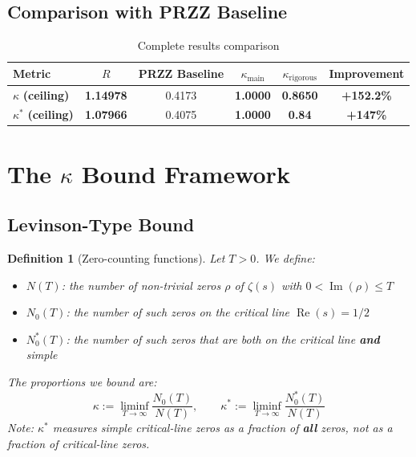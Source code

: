 \documentclass[11pt]{article}
\newtheorem{definition}{Definition}
\begin{document}
\subsection{Comparison with PRZZ Baseline}

\begin{table}[h]
\centering
\caption{Complete results comparison}
\begin{tabular}{lccccc}
\toprule
Metric & $R$ & PRZZ Baseline & $\kappa_{\text{main}}$ & $\kappa_{\text{rigorous}}$ & Improvement \\
\midrule
\rowcolor{yellow!30} $\kappa$ \textbf{(ceiling)} & \textbf{1.14978} & 0.4173 & \textbf{1.0000} & \textbf{0.8650} & \textcolor{improvement}{\textbf{+152.2\%}} \\
\rowcolor{yellow!30} $\kappa^*$ \textbf{(ceiling)} & \textbf{1.07966} & 0.4075 & \textbf{1.0000} & \textbf{0.84} & \textcolor{improvement}{\textbf{+147\%}} \\
\bottomrule
\end{tabular}
\end{table}

\section{The $\kappa$ Bound Framework}
\label{sec:framework}

\subsection{Levinson-Type Bound}

\begin{definition}[Zero-counting functions]
\label{def:zero-counting}
Let $T > 0$. We define:
\begin{itemize}
\item $N(T)$: the number of non-trivial zeros $\rho$ of $\zeta(s)$ with $0 < \operatorname{Im}(\rho) \leq T$
\item $N_0(T)$: the number of such zeros on the critical line $\operatorname{Re}(s) = 1/2$
\item $N_0^*(T)$: the number of such zeros that are both on the critical line \textbf{and} simple
\end{itemize}
The proportions we bound are:
\[
\kappa := \liminf_{T \to \infty} \frac{N_0(T)}{N(T)}, \qquad
\kappa^* := \liminf_{T \to \infty} \frac{N_0^*(T)}{N(T)}
\]
Note: $\kappa^*$ measures simple critical-line zeros as a fraction of \textbf{all} zeros, not as a fraction of critical-line zeros.
\end{definition}
\end{document}

